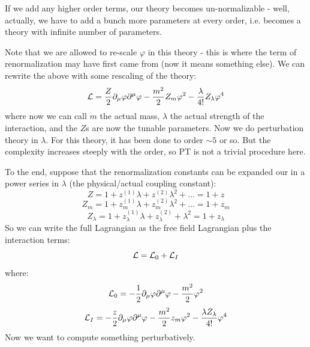 If we add any higher order terms, our theory becomes un-normalizable - well, actually, we have to add a bunch more parameters at every order, i.e. becomes a theory with infinite number of parameters.

Note that we are allowed to re-scale $\varphi$ in this theory - this is where the term of renormalization may have first came from (now it means something else). We can rewrite the above with some rescaling of the theory:
\begin{equation}
   \L = \frac{Z}{2}\p_\mu \varphi \p^\mu \varphi - \frac{m^2}{2}Z_m\varphi^2  - \frac{\lambda}{4!}Z_\lambda \varphi^4
\end{equation}
where now we can call $m$ the actual mass, $\lambda$ the actual strength of the interaction, and the $Z$s are now the tunable parameters. Now we do perturbation theory in $\lambda$. For this theory, it has been done to order $\sim 5$ or so. But the complexity increases steeply with the order, so PT is not a trivial procedure here.

To the end, suppose that the renormalization constants can be expanded our in a power series in $\lambda$ (the physical/actual coupling constant):
\begin{equation}
   Z = 1 + z^{(1)}\lambda + z^{(2)}\lambda^2 + \ldots = 1 + z
\end{equation}
\begin{equation}
   Z_m = 1 + z^{(1)}_m \lambda + z^{(2)}_m \lambda^2 + \ldots = 1 + z_m
\end{equation}
\begin{equation}
   Z_\lambda = 1 + z^{(1)}_\lambda \lambda + z^{(2)}_\lambda + \lambda^2 = 1 + z_\lambda
\end{equation}
So we can write the full Lagrangian as the free field Lagrangian plus the interaction terms:
\begin{equation}
   \mathcal{L} = \mathcal{L}_0 + \mathcal{L}_I
\end{equation}
where:
\begin{equation}
   \L_0 = -\frac{1}{2}\p_\mu \varphi \p^\mu \varphi - \frac{m^2}{2}\varphi^2
\end{equation}
\begin{equation}
   \L_I = -\frac{z}{2}\p_\mu \varphi \p^\mu \varphi - \frac{m^2}{2}z_m \varphi^2 - \frac{\lambda Z_\lambda}{4!}\varphi^4
\end{equation}
Now we want to compute something perturbatively.

